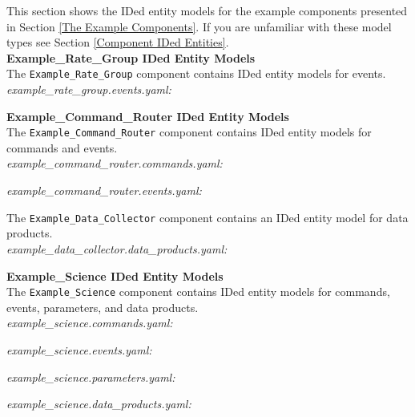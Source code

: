 This section shows the IDed entity models for the example components presented in Section \ref{The Example Components}. If you are unfamiliar with these model types see Section \ref{Component IDed Entities}. \\

\textbf{Example\_Rate\_Group IDed Entity Models} \\

The \texttt{Example\_Rate\_Group} component contains IDed entity models for events. \\

\textit{example\_rate\_group.events.yaml:}

\textbf{Example\_Command\_Router IDed Entity Models} \\

The \texttt{Example\_Command\_Router} component contains IDed entity models for commands and events. \\

\textit{example\_command\_router.commands.yaml:}

\textit{example\_command\_router.events.yaml:}

The \texttt{Example\_Data\_Collector} component contains an IDed entity model for data products. \\

\textit{example\_data\_collector.data\_products.yaml:}

\textbf{Example\_Science IDed Entity Models} \\

The \texttt{Example\_Science} component contains IDed entity models for commands, events, parameters, and data products. \\

\textit{example\_science.commands.yaml:}

\textit{example\_science.events.yaml:}

\textit{example\_science.parameters.yaml:}

\textit{example\_science.data\_products.yaml:}

